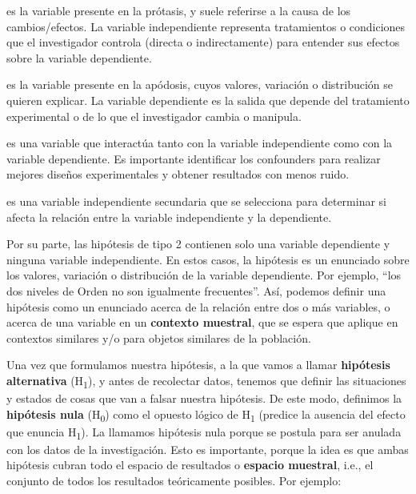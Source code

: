 \documentclass[12pt,spanish,a4paper,]{article}
\providecommand{\tightlist}{%
  \setlength{\itemsep}{0pt}\setlength{\parskip}{0pt}}
\begin{document}
\begin{description}
\tightlist
\item[variable independiente]
es la variable presente en la prótasis, y suele referirse a la causa de
los cambios/efectos. La variable independiente representa tratamientos o
condiciones que el investigador controla (directa o indirectamente) para
entender sus efectos sobre la variable dependiente.
\item[variable dependiente]
es la variable presente en la apódosis, cuyos valores, variación o
distribución se quieren explicar. La variable dependiente es la salida
que depende del tratamiento experimental o de lo que el investigador
cambia o manipula.
\item[\emph{confounder}]
es una variable que interactúa tanto con la variable independiente como
con la variable dependiente. Es importante identificar los confounders
para realizar mejores diseños experimentales y obtener resultados con
menos ruido.
\item[variable moderadora]
es una variable independiente secundaria que se selecciona para
determinar si afecta la relación entre la variable independiente y la
dependiente.
\end{description}

Por su parte, las hipótesis de tipo 2 contienen solo una variable
dependiente y ninguna variable independiente. En estos casos, la
hipótesis es un enunciado sobre los valores, variación o distribución de
la variable dependiente. Por ejemplo, ``\protect\hypertarget{h2}{}{los}
dos niveles de Orden no son igualmente frecuentes''. Así, podemos
definir una hipótesis como un enunciado acerca de la relación entre dos
o más variables, o acerca de una variable en un \textbf{contexto
muestral}, que se espera que aplique en contextos similares y/o para
objetos similares de la población.

Una vez que formulamos nuestra hipótesis, a la que vamos a llamar
\textbf{hipótesis} \textbf{alternativa} (H\textsubscript{1}), y antes de
recolectar datos, tenemos que definir las situaciones y estados de cosas
que van a falsar nuestra hipótesis. De este modo, definimos la
\textbf{hipótesis nula} (H\textsubscript{0}) como el opuesto lógico de
H\textsubscript{1} (predice la ausencia del efecto que enuncia
H\textsubscript{1}). La llamamos hipótesis nula porque se postula para
ser anulada con los datos de la investigación. Esto es importante,
porque la idea es que ambas hipótesis cubran todo el espacio de
resultados o \textbf{espacio muestral}, i.e., el conjunto de todos los
resultados teóricamente posibles. Por ejemplo:
\end{document}
